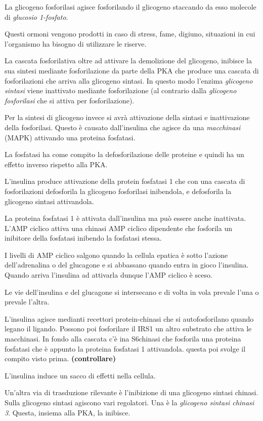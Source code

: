 \documentclass[]{article}
\begin{document}
La glicogeno fosforilasi agisce fosforilando il glicogeno staccando da
esso molecole di \emph{glucosio 1-fosfato}.

Questi ormoni vengono prodotti in caso di stress, fame, digiuno,
situazioni in cui l'organismo ha bisogno di utilizzare le riserve.

La cascata fosforilativa oltre ad attivare la demolizione del glicogeno,
inibisce la sua sintesi mediante fosforilazione da parte della PKA che
produce una cascata di fosforilazioni che arriva alla glicogeno sintasi.
In questo modo l'enzima \emph{glicogeno sintasi} viene inattivato
mediante fosforilazione (al contrario dalla \emph{glicogeno fosforilasi}
che si attiva per fosforilazione).

Per la sintesi di glicogeno invece si avrà attivazione della sintasi e
inattivazione della fosforilasi. Questo è causato dall'insulina che
agisce da una \emph{macchinasi} (MAPK) attivando una proteina fosfatasi.

La fosfatasi ha come compito la defosforilazione delle proteine e quindi
ha un effetto inverso rispetto alla PKA.

L'insulina produce attivazione della protein fosfatasi 1 che con una
cascata di fosforilazioni defosforila la glicogeno fosforilasi
inibendola, e defosforila la glicogeno sintasi attivandola.

La proteina fosfatasi 1 è attivata dall'insulina ma può essere anche
inattivata. L'AMP ciclico attiva una chinasi AMP ciclico dipendente che
fosforila un inibitore della fosfatasi inibendo la fosfatasi stessa.

I livelli di AMP ciclico salgono quando la cellula epatica è sotto
l'azione dell'adrenalina o del glucagone e si abbassano quando entra in
gioco l'insulina. Quando arriva l'insulina ad attivarla dunque l'AMP
ciclico è sceso.

Le vie dell'insulina e del glucagone si intersecano e di volta in vola
prevale l'una o prevale l'altra.

L'insulina agisce medianti recettori protein-chinasi che si
autofosforilano quando legano il ligando. Possono poi fosforilare il
IRS1 un altro substrato che attiva le macchinasi. In fondo alla cascata
c'è ina S6chinasi che fosforila una proteina fosfatasi che è appunto la
proteina fosfatasi 1 attivandola. questa poi svolge il compito visto
prima. \textbf{(controllare)}

L'insulina induce un sacco di effetti nella cellula.

Un'altra via di trasduzione rilevante è l'inibizione di una glicogeno
sintasi chinasi. Sulla glicogeno sintasi agiscono vari regolatori. Una è
la \emph{glicogeno sintasi chinasi 3}. Questa, insiema alla PKA, la
inibisce.
\end{document}

